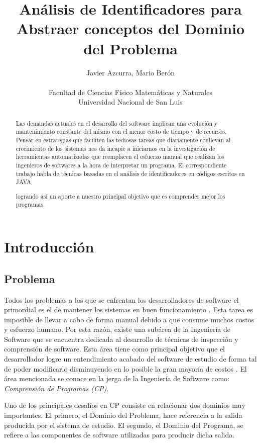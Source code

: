 \documentclass[12pt]{report}
\title{Análisis de Identificadores para Abstraer conceptos del Dominio del Problema}
\author{Javier Azcurra, Mario Berón\\\\Facultad de Ciencias Físico Matemáticas y Naturales\\Universidad Nacional de San Luis}
\begin{document}
\maketitle

\begin{abstract}
Las demandas actuales en el desarrollo del software implican una evolución y mantenimiento constante del mismo con el menor costo de tiempo y de recursos. Pensar en estrategias que faciliten las tediosas tareas que diariamente conllevan al crecimiento de los sistemas nos da incapie a iniciarnos en la investigación de herramientas automatizadas que reemplacen el esfuerzo manual que realizan los ingenieros de softwares a la hora de interpretar un programa. 
El correspondiente trabajo habla de técnicas basadas en el análisis de identificadores en códigos escritos en JAVA\texttrademark 

logrando así un aporte a nuestro principal objetivo que es comprender mejor los programas.



\end{abstract}

\chapter{Introducción}
\section{Problema}

Todos los problemas a los que se enfrentan los desarrolladores de software el primordial es el de mantener los sistemas en buen funcionamiento \cite{VMAVA95}. 
Esta tarea es imposible de llevar a cabo de forma manual debido a que consume 
muchos costos y esfuerzo humano. 
Por esta razón, existe una subárea de la Ingeniería de Software que se encuentra 
dedicada al desarrollo de técnicas de inspección y comprensión de software. 
Esta área tiene como principal objetivo que el desarrollador logre un entendimiento 
acabado del software de estudio de forma tal de poder modificarlo disminuyendo en 
lo posible la gran mayoría de costos \cite{BRM10}. 
El área mencionada se conoce en la jerga de la Ingeniería de Software como: 
\textit{Comprensión de Programas (CP)}.

Uno de los principales desafíos en CP consiste en relacionar 
dos dominios muy importantes. 
El primero, el Dominio del Problema, hace referencia a la salida producida por el sistema de estudio. El segundo, el Dominio del Programa, se refiere a las componentes de software utilizadas para producir dicha salida.
\end{document}
